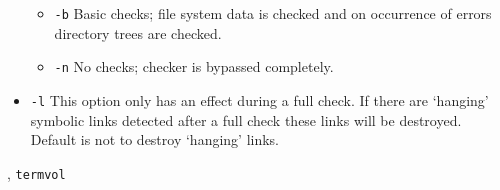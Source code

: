 \begin{man}
\begin{itemize}
\begin{itemize}
               \item {\tt -b}\newline
                 Basic checks; file system data is checked and on occurrence of
	         errors directory trees are checked.

               \item {\tt -n}\newline
                 No checks; checker is bypassed completely.
               \end{itemize}

             \item {\tt -l}\newline
               This option only has an effect during a full check.
	       If there are `hanging' symbolic links detected after a full
               check these links will be destroyed. Default is not to destroy
               `hanging' links.
             \end{itemize}

  , {\tt termvol}
\end{man}
